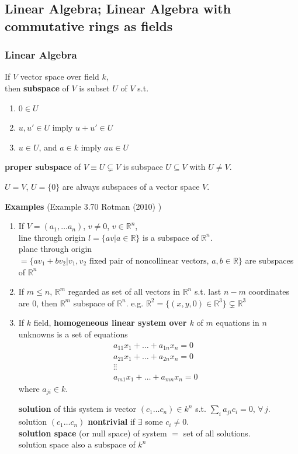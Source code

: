 \subsection{Linear Algebra; Linear Algebra with commutative rings as fields}

\subsubsection{Linear Algebra}

\begin{definition}[subspace]
	If $V$ vector space over field $k$, \\
	then \textbf{subspace} of $V$ is subset $U$ of $V$ s.t. 
	\begin{enumerate}
		\item $0\in U$
		\item $u,u' \in U$ imply $u+u' \in U$ 
		\item $u\in U$, and $a\in k$ imply $au \in U$
	\end{enumerate}
	\textbf{proper subspace} of $V \equiv U \subsetneq V$ is subspace $U \subseteq V$ with $U \neq V$.
\end{definition}
$U =V$, $U = \lbrace 0 \rbrace$ are always subspaces of a vector space $V$. 

\textbf{Examples} (Example 3.70 Rotman (2010) \cite{agat:JRotman2010}) 
\begin{enumerate}
	\item[(ii)] If $V=(a_1, \dots a_n)$, $v\neq 0$, $v\in \mathbb{R}^n$, \\
	line through origin $l = \lbrace av | a \in \mathbb{R} \rbrace$ is a subspace of $\mathbb{R}^n$. \\
	plane through origin $=\lbrace av_1 + bv_2 | v_1 , v_2 \text{ fixed pair of noncollinear vectors, } a,b \in \mathbb{R} \rbrace$ are subspaces of $\mathbb{R}^n$
	\item[(iii)] If $m\leq n$, $\mathbb{R}^m$ regarded as set of all vectors in $\mathbb{R}^n$ s.t. last $n-m$ coordinates are $0$, then $\mathbb{R}^m$ subspace of $\mathbb{R}^n$.
	e.g. $\mathbb{R}^2 = \lbrace (x,y,0) \in \mathbb{R}^3 \rbrace \subsetneq \mathbb{R}^3$
	\item[(iv)] If $k$ field, \textbf{homogeneous linear system over $k$ } of $m$ equations in $n$ unknowns is a set of equations
	\[
	\begin{aligned}
	a_{11} x_1 + \dots + a_{1n} x_n = 0 & \\
	a_{21} x_1 + \dots + a_{2n} x_n = 0 & \\
	\vdots \vdots & \\
		a_{m1} x_1 + \dots + a_{mn} x_n = 0 & 
	\end{aligned}
	\] 
	where $a_{ji} \in k$.
	
	\textbf{solution} of this system is vector $(c_1 \dots c_n) \in k^n$ s.t. $\sum_i a_{ji} c_i  =0$, $\forall \, j$. \\
	solution $(c_1 \dots c_n)$ \textbf{nontrivial} if $\exists$ some $c_i \neq 0$. \\
	\textbf{solution space} (or null space) of system $=$ set of all solutions. \\
	solution space also a subspace of $k^n$
\end{enumerate}

